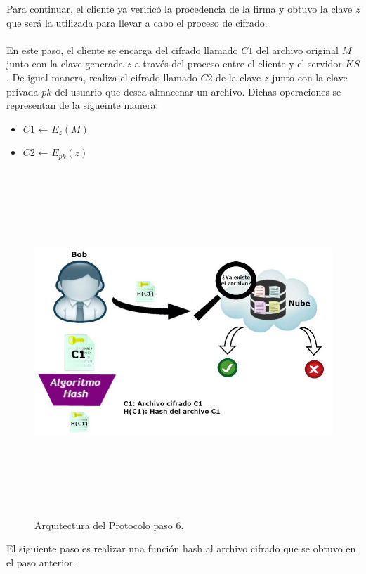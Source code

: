 Para continuar, el cliente ya verificó la procedencia de la firma y obtuvo la clave $z$ que será la utilizada para llevar a cabo el proceso de cifrado. \\ \\
En este paso, el cliente se encarga del cifrado llamado $C1$ del archivo original $M$ junto con la clave generada $z$ a través del proceso entre el cliente y el servidor $KS$. De igual manera, realiza el cifrado llamado $C2$ de la clave $z$ junto con la clave privada $pk$ del usuario que desea almacenar un archivo. Dichas operaciones se representan de la sigueinte manera: 

\begin{itemize}
	\item $C1$ ← $E_{z}(M)$
	\item $C2$ ← $E_{pk}(z)$
\end{itemize}



\begin{figure}[H]
\centering
\includegraphics[width=16cm, height=13cm]{./images/Paso05.jpg}
\caption{Arquitectura del Protocolo paso 6.}

\end{figure}

El siguiente paso es realizar una función hash al archivo cifrado que se obtuvo en el paso anterior.\\ \\ 

